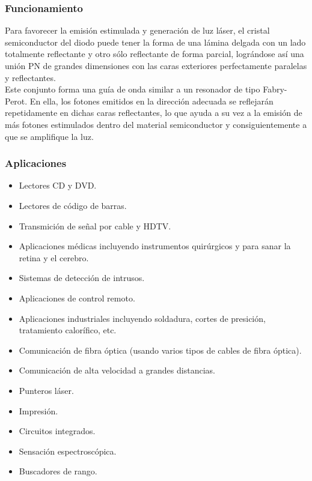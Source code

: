 \documentclass[letterpaper, 12pt]{article}
\begin{document}
\begin{justify}
        \subsubsection{Funcionamiento}
        Para favorecer la emisión estimulada y generación de luz láser, el cristal semiconductor del diodo puede tener la forma de una lámina delgada con un lado totalmente reflectante y otro sólo reflectante de forma parcial,
        lográndose así una unión PN de grandes dimensiones con las caras exteriores perfectamente paralelas y reflectantes.\\\newline
        Este conjunto forma una guía de onda similar a un resonador de tipo Fabry-Perot. En ella, los fotones emitidos en la dirección adecuada se reflejarán repetidamente en dichas caras reflectantes, lo que ayuda a su vez a la emisión de más
        fotones estimulados dentro del material semiconductor y consiguientemente a que se amplifique la luz.
        \subsubsection{Aplicaciones}
        \begin{itemize}
            \item Lectores CD y DVD.
            \item Lectores de código de barras.
            \item Transmición de señal por cable y HDTV.
            \item Aplicaciones médicas incluyendo instrumentos quirúrgicos y para sanar la retina y el cerebro.
            \item Sistemas de detección de intrusos.
            \item Aplicaciones de control remoto.
            \item Aplicaciones industriales incluyendo soldadura, cortes de presición, tratamiento calorífico, etc.
            \item Comunicación de fibra óptica (usando varios tipos de cables de fibra óptica).
            \item Comunicación de alta velocidad a grandes distancias.
            \item Punteros láser.
            \item Impresión.
            \item Circuitos integrados.
            \item Sensación espectroscópica.
            \item Buscadores de rango.
        \end{itemize}

\end{justify}
\end{document}
